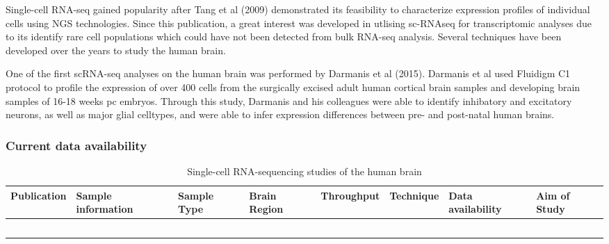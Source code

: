 \documentclass[12pt]{article}
\begin{document}
    Single-cell RNA-seq gained popularity after Tang et al (2009) demonstrated its feasibility to characterize expression profiles of individual cells using NGS technologies. 
    Since this publication, a great interest was developed in utlising sc-RNAseq for transcriptomic analyses due to its identify rare cell populations which could have not been detected from bulk RNA-seq analysis.
    Several techniques have been developed over the years to study the human brain. 
   
    
    One of the first scRNA-seq analyses on the human brain was performed by Darmanis et al (2015). Darmanis et al used Fluidigm C1 protocol to profile the expression of over 400 cells from the surgically excised adult human cortical brain samples and developing brain samples of 16-18 weeks pc embryos. Through this study, Darmanis and his colleagues were able to identify inhibatory and excitatory neurons, as well as major glial celltypes, and were able to infer expression differences between pre- and post-natal human brains. 
    
    

    
    
  
   
  \subsubsection{Current data availability}
  
  \begin{landscape}
  	\begin{table}[!htp]
  		\centering
  		\scriptsize
  		\caption{Single-cell RNA-sequencing studies of the human brain}
  		\begin{tabular}{|l|l|l|l|l|l|l|l|}
  			\hline
  			\textbf{Publication} & \textbf{Sample information} &\textbf{Sample Type} &\textbf{Brain Region} & \textbf{Throughput} & \textbf{Technique}  &\textbf{Data availability}& \textbf{Aim of Study} \\ \hline
  			\cite{darmanis2015survey} & & & & & & & \\ \hline
  			\cite{johnson2015single} & & & & & & & \\ \hline
  			\cite{nowakowski2017spatiotemporal} & & & & & & & \\ \hline
  			\cite{fan2018spatial} & & & & & & & \\ \hline 
  			\cite{polioudakis2019single} & & & & & & & \\ \hline
  			
  		\end{tabular}
  	\end{table}
  \end{landscape}
  
 
 
    
    
    
\end{document}
